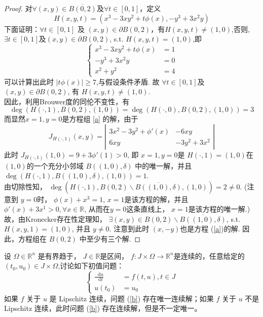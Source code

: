 \documentclass[a4,10pt]{ctexart}
\newcommand*{\dif}{\mathop{}\!\mathrm{d}}
\begin{document}
\begin{proof}
    对$\forall(x,y)\in\overline{B(0,2)}$及$\forall{t\in[0,1]}$，定义
    \begin{equation}
      H(x,y,t) = (x^3-3xy^2+t\phi(x), -y^3+3x^2y)
    \end{equation}
    下面证明：$\forall{t}\in[0,1]$ 及 $(x,y)\in\partial{B(0,2)}$，有$H(x,y,t)\neq(1,0)$,否则, $\exists{t\in[0,1]}$及$(x,y)\in\partial{B(0,2)}$, s.t. $H(x,y,t)=(1,0)$,即
    \begin{equation}
      \left\{\begin{aligned}
      x^3 - 3xy^2 + t\phi(x) &= 1\\
      -y^3 + 3x^2y &= 0 \\
      x^2 + y^2 &= 4
      \end{aligned}\right. 
    \end{equation}
    可以计算出此时 $|t\phi(x)|\ge{7}$,与假设条件矛盾. 故 $\forall{t}\in[0,1]$及 $(x,y)\in{\partial{B(0,2)}}$, 有 $H(x,y,t)\neq(1,0)$.\\
    因此，利用Brouwer度的同伦不变性，有
    \begin{equation}
      \deg(H(\cdot, 1), B(0,2), (1,0)) = \deg(H(\cdot, 0), B(0,2), (1,0))=3
    \end{equation}
    而显然$x=1, y=0$是方程组 \eqref{a} 的解，由于
    \begin{equation}
      J_{H(\cdot,1)}(x,y) = \left|\begin{matrix}
      3x^2-3y^2+\phi'(x) & -6xy \\
      6xy & -3y^2+3x^2
      \end{matrix}\right|
    \end{equation}
    此时 $J_{H(\cdot, 1)}(1,0) = 9+3\phi'(1)>0$, 即 $x=1, y=0$是 $H(\cdot, 1)=(1,0)$在 $(1,0)$的一个充分小邻域 $B((1,0),\delta)$ 中的唯一解，并且 $\deg(H(\cdot, 1), B((1,0),\delta),(1,0))=1$.\\
    由切除性知， $\deg(H(\cdot, 1),B(0,2)\backslash\overline{B((1,0),\delta)},(1,0)) =2 \neq{0}$. (注意到 $y=0$时， $\phi(x)+x^3=1$, $x=1$是该方程的解，并且 $\phi'(x)+3x^1>0, \forall{x\in{\mathbb{R}}}$, 从而在$y=0$这条直线上， $x=1$是该方程的唯一解.)故，由Kronecker存在性定理知， $\exists(x,y)\in{B(0,2)\backslash\overline{B((1,0), \delta)}}$, s.t. $H(x,y,1)=(1,0)$, 并且 $y\neq{0}$. 注意到此时 $(x,-y)$也是方程 (\ref{a})的解. 因此，方程组在 $B(0,2)$ 中至少有三个解.
\end{proof}
\begin{lt}
  设 $\Omega\in\mathbb{R}^n$ 是有界趋于， $J\in\mathbb{R}$是区间， $f:J\times\Omega\to\mathbb{R}^n$是连续的，任意给定的 $(t_0, u_0)\in{J\times\Omega}$,讨论如下初值问题：
  \begin{equation}
    \left\{\begin{aligned}
    \frac{\dif{u}}{\dif{t}} &= f(t,u), t\in{J} \\
    u(t_0) & =u_0
    \end{aligned}\right. \label{b}
  \end{equation}
  如果 $f$ 关于 $u$ 是 Lipschitz 连续，问题 (\ref{b}) 存在唯一连续解；如果 $f$ 关于 $u$ 不是Lipschitz 连续，此时问题 (\ref{b}) 存在连续解，但是不一定唯一。
\end{lt}
\end{document}
